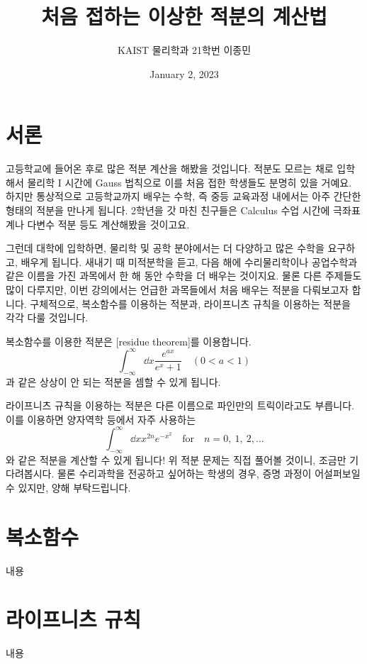 \documentclass[11pt]{book}
\title{처음 접하는 이상한 적분의 계산법}
\author{KAIST 물리학과 21학번 이종민}
\date{January 2, 2023}
\begin{document}
\section*{서론}
\begin{MLPar}
고등학교에 들어온 후로 많은 적분 계산을 해봤을 것입니다.
적분도 모르는 채로 입학해서 물리학 I 시간에 Gauss 법칙으로 이를 처음 접한 학생들도 분명히 있을 거예요.
하지만 통상적으로 고등학교까지 배우는 수학, 즉 중등 교육과정 내에서는 아주 간단한 형태의 적분을 만나게 됩니다.
2학년을 갓 마친 친구들은 Calculus 수업 시간에 극좌표계나 다변수 적분 등도 계산해봤을 것이고요.

그런데 대학에 입학하면, 물리학 및 공학 분야에서는 더 다양하고 많은 수학을 요구하고, 배우게 됩니다.
새내기 때 미적분학을 듣고, 다음 해에 수리물리학이나 공업수학과 같은 이름을 가진 과목에서 한 해 동안 수학을 더 배우는 것이지요.
물론 다른 주제들도 많이 다루지만, 이번 강의에서는 언급한 과목들에서 처음 배우는 적분을 다뤄보고자 합니다.
구체적으로, 복소함수를 이용하는 적분과, 라이프니츠 규칙을 이용하는 적분을 각각 다룰 것입니다.

복소함수를 이용한 적분은 [residue theorem]를 이용합니다.
\begin{equation*}
\int_{-\infty}^{\infty}\dd{x} \frac{e^{ax}}{e^x + 1} \quad(0 < a < 1)
\end{equation*}
과 같은 상상이 안 되는 적분을 셈할 수 있게 됩니다.

라이프니츠 규칙을 이용하는 적분은 다른 이름으로 파인만의 트릭이라고도 부릅니다.
이를 이용하면 양자역학 등에서 자주 사용하는
\begin{equation*}
    \int_{-\infty}^{\infty}\dd{x} x^{2n} e^{-x^2} \quad\text{for}\quad n=0,\ 1,\ 2, \ldots
\end{equation*}
와 같은 적분을 계산할 수 있게 됩니다!
위 적분 문제는 직접 풀어볼 것이니, 조금만 기다려봅시다.
물론 수리과학을 전공하고 싶어하는 학생의 경우, 증명 과정이 어설퍼보일 수 있지만, 양해 부탁드립니다.
\end{MLPar}

\section{복소함수}
\begin{MLPar}
내용
\end{MLPar}

\section{라이프니츠 규칙}
\begin{MLPar}
내용
\end{MLPar}
\end{document}
